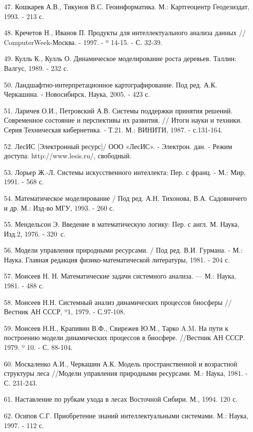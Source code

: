 \documentclass{article}
\begin{document}
47. Кошкарев А.В., Тикунов В.С. Геоинформатика. 
М.: Картгеоцентр Геодезиздат, 1993. - 213 с.

48. Кречетов Н., Иванов П. Продукты для интеллектуального 
анализа данных // ComputerWeek-Москва. - 1997. - º 14-15. - 
С. 32-39.

49. Кулль К., Кулль О. Динамическое моделирование 
роста деревьев. Таллин: Валгус, 1989. - 232 с.

50. Ландшафтно-интерпретационное картографирование. 
Под ред. А.К. Черкашина.  - Новосибирск, Наука, 
2005. - 423 с.

51. Ларичев О.И., Петровский А.В. Системы поддержки 
принятия решений. Современное состояние и перспективы 
их развития. // Итоги науки и техники. Серия Техническая 
кибернетика. - Т.21. М.: ВИНИТИ, 1987. - с.131-164.

52. ЛесИС [Электронный ресурс]/ ООО «ЛесИС». - 
Электрон. дан. - Режим доступа: http://www.lesis.ru/, свободный.

53. Лорьер Ж.-Л. Системы искусственного интеллекта: 
Пер. с франц. -  М.: Мир, 1991. - 568 с.

54. Математическое моделирование / Под ред. А.Н. 
Тихонова, В.А. Садовничего и др. М.: Изд-во МГУ, 
1993. - 260 с.

55. Мендельсон Э. Введение в математическую логику: 
Пер. с англ. М. Наука, Изд.2, 1976. - 320~с.

56. Модели управления природными ресурсами. 
/ Под ред. В.И. Гурмана. - М.: Наука. Главная редакция 
физико-математической литературы, 1981. - 204 с.\label{OLEHLINK28}\label{OLEHLINK29}

57. Моисеев Н. Н. Математические задачи системного 
анализа. --- М.: Наука, 1981. - 488 с.

58. Моисеев Н.Н. Системный анализ динамических 
процессов биосферы // Вестник АН СССР, º1, 1979. 
- С.97-108.

59. Моисеев Н.Н., Крапивин В.Ф., Свирежев Ю.М., Тарко 
A.M. На пути к построению модели динамических 
процессов в биосфере. //Вестник АН СССР. 1979. º 
10. - С. 88-104. 

60. Москаленко А.И., Черкашин А.К. Модель пространственной 
и возрастной структуры леса //Модели управления 
природными ресурсами. М.: Наука, 1981. - С. 231-243.

61. Наставление по рубкам ухода в лесах Восточной 
Сибири. М., 1994. 120 с.

62. Осипов С.Г. Приобретение знаний интеллектуальными 
системами. М.: Наука, 1997. - 112 с.
\end{document}
